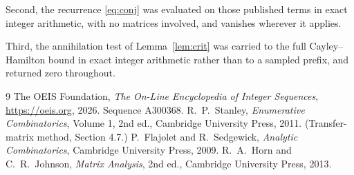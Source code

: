 \documentclass[11pt,a4paper]{article}
\theoremstyle{plain}
\theoremstyle{definition}
\begin{document}
Second, the recurrence \eqref{eq:conj} was evaluated on those published terms in exact
integer arithmetic, with no matrices involved, and vanishes wherever it applies.

Third, the annihilation test of Lemma~\ref{lem:crit} was carried to the full
Cayley--Hamilton bound in exact integer arithmetic rather than to a sampled prefix, and
returned zero throughout.

\begin{thebibliography}{9}
 The OEIS Foundation, \emph{The On-Line Encyclopedia of Integer
Sequences}, \url{https://oeis.org}, 2026. Sequence A300368.
 R.~P.~Stanley, \emph{Enumerative Combinatorics}, Volume 1, 2nd ed.,
Cambridge University Press, 2011. (Transfer-matrix method, Section 4.7.)
 P.~Flajolet and R.~Sedgewick, \emph{Analytic Combinatorics}, Cambridge
University Press, 2009.
 R.~A.~Horn and C.~R.~Johnson, \emph{Matrix Analysis}, 2nd ed., Cambridge
University Press, 2013.
\end{thebibliography}
\end{document}
